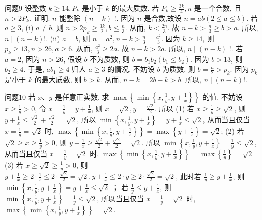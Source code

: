 问题9 设整数 $k \geqslant 14, P_k$ 是小于 $k$ 的最大质数.
若 $P_k \geqslant \frac{3 k}{4}, n$ 是一个合数, 且 $n>2 P_k$, 证明: $n$ 能整除 $(n-k)$ !.
因为 $n$ 是合数,故设 $n=a b(2 \leqslant a \leqslant b)$.
若 $a \geqslant 3$, (i) $a \neq b$, 则 $n>2 p_k \geqslant \frac{3 k}{2}, b \leqslant \frac{n}{3}$. 从而, $k<\frac{2 n}{3}$. 故 $n-k> \frac{n}{3} \geqslant b>a$. 所以, $n \mid(n-k) !$. (ii) $a=b$, 则 $n=a^2, n-k>\frac{n}{3}=\frac{a^2}{3}$. 因为 $k \geqslant 14$, 则 $p_k \geqslant 13, n>26, a \geqslant 6$. 从而, $\frac{a^2}{3} \geqslant 2 a$. 故 $n-k>2 a$. 所以, $n \mid(n-k)$ !. 若 $a=2$, 因为 $n>26$, 假设 $b$ 不为质数, 则 $b=b_1 b_2\left(b_1 \leqslant b_2\right)$. 因为 $b>13$, 则 $b_2 \geqslant 4$. 于是, $a b_1 \geqslant 4$ 归人 $a \geqslant 3$ 的情况.
不妨设 $b$ 为质数, 则 $b= \frac{n}{2}>p_k$. 因为 $p_k$ 是小于 $k$ 的最大质数, 则 $b>k$. 从而, $n-k=2 b-k>b$. 所以, $n \mid(n-k) !$.



问题10 若 $x 、 y$ 是任意正实数, 求 $\max \left\{\min \left\{x, \frac{1}{y}, y+\frac{1}{x}\right\}\right\}$ 的值.
不妨设 $x \geqslant \frac{1}{y}>0$, 令 $x=\frac{1}{y}=y+\frac{1}{x}$, 则 $x=\sqrt{2}, y=\frac{\sqrt{2}}{2}$. 所以
(1) 若 $x \geqslant \frac{1}{y} \geqslant \sqrt{2}$, 则 $y+\frac{1}{x} \leqslant \frac{\sqrt{2}}{2}+\frac{\sqrt{2}}{2}=\sqrt{2}$, 所以 $\min \left\{x, \frac{1}{y}, y+\frac{1}{x}\right\}= y+\frac{1}{x} \leqslant \sqrt{2}$, 从而当且仅当 $x=\frac{1}{y}=\sqrt{2}$ 时, $\max \left\{\min \left\{x, \frac{1}{y}, y+\frac{1}{x}\right\}\right\}= \max \left\{y+\frac{1}{x}\right\}=\sqrt{2}$;
(2) 若 $\sqrt{2} \geqslant x \geqslant \frac{1}{y}>0$, 则 $y+\frac{1}{x} \geqslant \frac{\sqrt{2}}{2}+\frac{\sqrt{2}}{2}=\sqrt{2}$. 所以 $\min \left\{x, \frac{1}{y}, y+ \frac{1}{x}\right\}=\frac{1}{y} \leqslant \sqrt{2}$, 从而当且仅当 $x=\frac{1}{y}=\sqrt{2}$ 时, $\max \left\{\min \left\{x, \frac{1}{y}, y+\frac{1}{x}\right\}\right\}= \max \left\{\frac{1}{y}\right\}=\sqrt{2}$
(3) 若 $x \geqslant \sqrt{2} \geqslant \frac{1}{y}>0$, 则 $y+\frac{1}{x} \geqslant 2 \cdot \frac{1}{x} \leqslant 2 \cdot \frac{\sqrt{2}}{2}=\sqrt{2}, y+\frac{1}{x} \leqslant 2 \cdot y \geqslant 2 \cdot \frac{\sqrt{2}}{2}=\sqrt{2}$, 此时若 $\frac{1}{y} \geqslant y+\frac{1}{x}$, 则 $\min \left\{x, \frac{1}{y}, y+\frac{1}{x}\right\}=y+\frac{1}{x} \leqslant \sqrt{2}$ ； 若 $\frac{1}{y} \leqslant y+\frac{1}{x}$, 则 $\min \left\{x, \frac{1}{y}, y+\frac{1}{x}\right\}=\frac{1}{y} \leqslant \sqrt{2}$, 所以当且仅当 $x=\frac{1}{y}=\sqrt{2}$ 时, $\max \left\{\min \left\{x, \frac{1}{y}, y+\frac{1}{x}\right\}\right\}=\sqrt{2}$.



